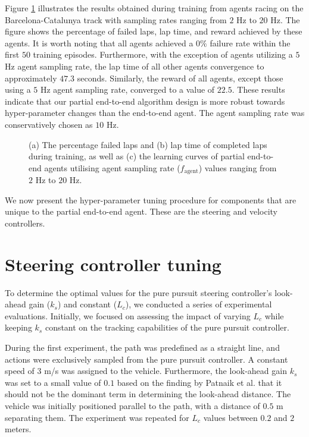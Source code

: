 Figure \ref{fig:f_agent_pete} illustrates the results obtained during training from agents racing on the Barcelona-Catalunya track with sampling rates ranging from $2$ Hz to $20$ Hz. 
The figure shows the percentage of failed laps, lap time, and reward achieved by these agents. 
It is worth noting that all agents achieved a $0\%$ failure rate within the first $50$ training episodes.
Furthermore, with the exception of agents utilizing a $5$ Hz agent sampling rate, the lap time of all other agents convergence to approximately $47.3$ seconds. 
Similarly, the reward of all agents, except those using a $5$ Hz agent sampling rate, converged to a value of $22.5$.
These results indicate that our partial end-to-end algorithm design is more robust towards hyper-parameter changes than the end-to-end agent.
The agent sampling rate was conservatively chosen as $10$ Hz.

\begin{figure}[htb!]
    \centering
    
    \caption[Learning curves for partial end-to-end agents trained with different agent sampling rates]{(a) The percentage failed laps and (b) lap time of completed laps during training, as well as (c) the learning curves of partial end-to-end agents utilising agent sampling rate ($f_{\text{agent}}$) values ranging from $2$ Hz to $20$ Hz.}
    \label{fig:f_agent_pete}
\end{figure}

We now present the hyper-parameter tuning procedure for components that are unique to the partial end-to-end agent.
These are the steering and velocity controllers.




\section{Steering controller tuning}

To determine the optimal values for the pure pursuit steering controller's look-ahead gain ($k_s$) and constant ($L_c$), we conducted a series of experimental evaluations. 
Initially, we focused on assessing the impact of varying $L_c$ while keeping $k_s$ constant on the tracking capabilities of the pure pursuit controller.

During the first experiment, the path was predefined as a straight line, and actions were exclusively sampled from the pure pursuit controller. 
A constant speed of $3$ m/s was assigned to the vehicle.
Furthermore, the look-ahead gain $k_s$ was set to a small value of $0.1$ based on the finding by Patnaik et al. \cite{Patnaik2020} that it should not be the dominant term in determining the look-ahead distance.
The vehicle was initially positioned parallel to the path, with a distance of $0.5$ m separating them. 
The experiment was repeated for $L_c$ values between $0.2$ and $2$ meters.

